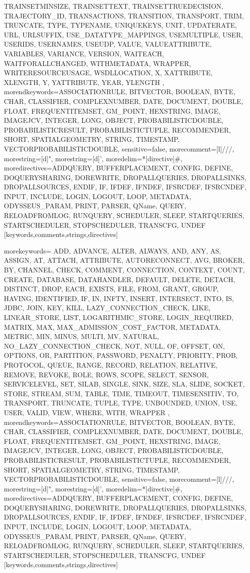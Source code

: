 {{TRAINSETMINSIZE, TRAINSETTEXT, TRAINSETTRUEDECISION, TRAJECTORY_ID, TRANSACTIONS, TRANSITION, TRANSPORT, TRIM, TRUNCATE, TYPE, TYPENAME, UNIQUEKEYS, UNIT, UPDATERATE, URL, URLSUFFIX, USE_DATATYPE_MAPPINGS, USEMULTIPLE, USER, USERIDS, USERNAMES, USEUDP, VALUE, VALUEATTRIBUTE, VARIABLES, VARIANCE, VERSION, WAITEACH, WAITFORALLCHANGED, WITHMETADATA, WRAPPER, WRITERESOURCEUSAGE, WSDLLOCATION, X, XATTRIBUTE, XLENGTH, Y, YATTRIBUTE, YEAR, YLENGTH%
      },%
   morendkeywords={ASSOCIATIONRULE, BITVECTOR, BOOLEAN, BYTE, CHAR, CLASSIFIER, COMPLEXNUMBER, DATE, DOCUMENT, DOUBLE, FLOAT, FREQUENTITEMSET, GM_POINT, HEXSTRING, IMAGE, IMAGEJCV, INTEGER, LONG, OBJECT, PROBABILISTICDOUBLE, PROBABILISTICRESULT, PROBABILISTICTUPLE, RECOMMENDER, SHORT, SPATIALGEOMETRY, STRING, TIMESTAMP, VECTORPROBABILISTICDOUBLE},%
   sensitive=false,
   morecomment=[l]///,%
   morestring=[d]",%
   morestring=[d]',%
   moredelim=*[directive]\#,%
   moredirectives={ADDQUERY, BUFFERPLACEMENT, CONFIG, DEFINE, DOQUERYSHARING, DOREWRITE, DROPALLQUERIES, DROPALLSINKS, DROPALLSOURCES, ENDIF, IF, IFDEF, IFNDEF, IFSRCDEF, IFSRCNDEF, INPUT, INCLUDE, LOGIN, LOGOUT, LOOP, METADATA, ODYSSEUS_PARAM, PRINT, PARSER, QName, QUERY, RELOADFROMLOG, RUNQUERY, SCHEDULER, SLEEP, STARTQUERIES, STARTSCHEDULER, STOPSCHEDULER, TRANSCFG, UNDEF}%
}[keywords,comments,strings,directives]

%
   {morekeywords={%
ADD, ADVANCE, ALTER, ALWAYS, AND, ANY, AS, ASSIGN, AT, ATTACH, ATTRIBUTE, AUTORECONNECT, AVG, BROKER, BY, CHANNEL, CHECK, COMMENT, CONNECTION, CONTEXT, COUNT, CREATE, DATABASE, DATAHANDLER, DEFAULT, DELETE, DETACH, DISTINCT, DROP, EACH, EXISTS, FILE, FROM, GRANT, GROUP, HAVING, IDENTIFIED, IF, IN, INFTY, INSERT, INTERSECT, INTO, IS, JDBC, JOIN, KEY, KILL, LAZY_CONNECTION_CHECK, LIKE, LINEAR_STORE, LIST, LOGARITHMIC_STORE, LOGIN_REQUIRED, MATRIX, MAX, MAX_ADMISSION_COST_FACTOR, METADATA, METRIC, MIN, MINUS, MULTI, MV, NATURAL, NO_LAZY_CONNECTION_CHECK, NOT, NULL, OF, OFFSET, ON, OPTIONS, OR, PARTITION, PASSWORD, PENALTY, PRIORITY, PROB, PROTOCOL, QUEUE, RANGE, RECORD, RELATION, RELATIVE, REMOVE, REVOKE, ROLE, ROWS, SCOPE, SELECT, SENSOR, SERVICELEVEL, SET, SILAB, SINGLE, SINK, SIZE, SLA, SLIDE, SOCKET, STORE, STREAM, SUM, TABLE, TIME, TIMEOUT, TIMESENSITIV, TO, TRANSPORT, TRUNCATE, TUPLE, TYPE, UNBOUNDED, UNION, USE, USER, VALID, VIEW, WHERE, WITH, WRAPPER%
      },%
   morendkeywords={ASSOCIATIONRULE, BITVECTOR, BOOLEAN, BYTE, CHAR, CLASSIFIER, COMPLEXNUMBER, DATE, DOCUMENT, DOUBLE, FLOAT, FREQUENTITEMSET, GM_POINT, HEXSTRING, IMAGE, IMAGEJCV, INTEGER, LONG, OBJECT, PROBABILISTICDOUBLE, PROBABILISTICRESULT, PROBABILISTICTUPLE, RECOMMENDER, SHORT, SPATIALGEOMETRY, STRING, TIMESTAMP, VECTORPROBABILISTICDOUBLE},%
   sensitive=false,
   morecomment=[l]///,%
   morestring=[d]",%
   morestring=[d]',%
   moredelim=*[directive]\#,%
   moredirectives={ADDQUERY, BUFFERPLACEMENT, CONFIG, DEFINE, DOQUERYSHARING, DOREWRITE, DROPALLQUERIES, DROPALLSINKS, DROPALLSOURCES, ENDIF, IF, IFDEF, IFNDEF, IFSRCDEF, IFSRCNDEF, INPUT, INCLUDE, LOGIN, LOGOUT, LOOP, METADATA, ODYSSEUS_PARAM, PRINT, PARSER, QName, QUERY, RELOADFROMLOG, RUNQUERY, SCHEDULER, SLEEP, STARTQUERIES, STARTSCHEDULER, STOPSCHEDULER, TRANSCFG, UNDEF}%
}[keywords,comments,strings,directives]

